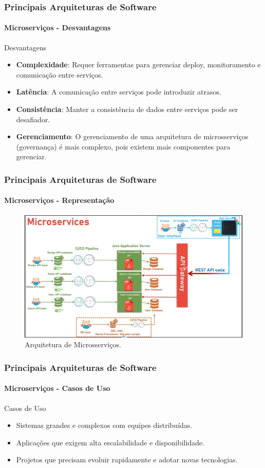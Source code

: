 \documentclass[
	10pt, %
	t, %
]{beamer}
\begin{document}
\begin{frame}
	\frametitle{Principais Arquiteturas de Software}
	\framesubtitle{Microserviços - Desvantagens}

	\begin{alertblock}{Desvantagens}
		\begin{itemize}
			\item \textbf{Complexidade}: Requer ferramentas para gerenciar deploy, monitoramento e comunicação entre serviços.
			\item \textbf{Latência}: A comunicação entre serviços pode introduzir atrasos.
			\item \textbf{Consistência}: Manter a consistência de dados entre serviços pode ser desafiador.
			\item \textbf{Gerenciamento}: O gerenciamento de uma arquitetura de microsserviços (governança) é mais complexo, pois existem mais componentes para gerenciar.
		\end{itemize}
	\end{alertblock}

\end{frame}

\begin{frame}
	\frametitle{Principais Arquiteturas de Software}
	\framesubtitle{Microserviços - Representação}
	
	\begin{figure}
		\centering
		\includegraphics[width=0.9\linewidth]{Images/microservice.png}
		\caption{Arquitetura de Microsserviços.}\label{fig:microservices}
	\end{figure}

\end{frame}

\begin{frame}
	\frametitle{Principais Arquiteturas de Software}
	\framesubtitle{Microserviços - Casos de Uso}

	\begin{exampleblock}{Casos de Uso}
		\begin{itemize}
			\item Sistemas grandes e complexos com equipes distribuídas.
			\item Aplicações que exigem alta escalabilidade e disponibilidade.
			\item Projetos que precisam evoluir rapidamente e adotar novas tecnologias.
		\end{itemize}
	\end{exampleblock}

\end{frame}
\end{document}
